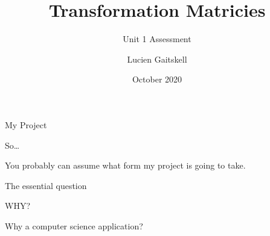 \documentclass{beamer}
\title{Transformation Matricies}
\subtitle{Unit 1 Assessment}
\author{Lucien Gaitskell}
\date{October 2020}
\begin{document}
\maketitle

\begin{frame}{My Project}

So\dots \pause

\large You probably can assume what form my project is going to take.

\end{frame}

\begin{frame}{The essential question}
  
  \begin{center}
    \Huge WHY? \pause

    \Large Why a computer science application?
  \end{center}

\end{frame}
\end{document}

